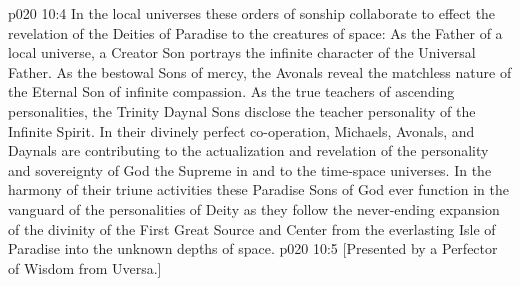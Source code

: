 \vs p020 10:4 In the local universes these orders of sonship collaborate to effect the revelation of the Deities of Paradise to the creatures of space: As the Father of a local universe, a Creator Son portrays the infinite character of the Universal Father. As the bestowal Sons of mercy, the Avonals reveal the matchless nature of the Eternal Son of infinite compassion. As the true teachers of ascending personalities, the Trinity Daynal Sons disclose the teacher personality of the Infinite Spirit. In their divinely perfect co\hyp{}operation, Michaels, Avonals, and Daynals are contributing to the actualization and revelation of the personality and sovereignty of God the Supreme in and to the time\hyp{}space universes. In the harmony of their triune activities these Paradise Sons of God ever function in the vanguard of the personalities of Deity as they follow the never\hyp{}ending expansion of the divinity of the First Great Source and Center from the everlasting Isle of Paradise into the unknown depths of space.
\vsetoff
\vs p020 10:5 [Presented by a Perfector of Wisdom from Uversa.]
